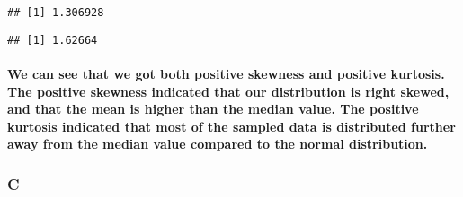 \documentclass[
]{article}
\newenvironment{Shaded}{\begin{snugshade}}{\end{snugshade}}
\newcommand{\ConstantTok}[1]{\textcolor[rgb]{0.00,0.00,0.00}{#1}}
\newcommand{\FunctionTok}[1]{\textcolor[rgb]{0.00,0.00,0.00}{#1}}
\newcommand{\NormalTok}[1]{#1}
\newcommand{\SpecialCharTok}[1]{\textcolor[rgb]{0.00,0.00,0.00}{#1}}
\begin{document}
\begin{Shaded}
\end{Shaded}

\begin{verbatim}
## [1] 1.306928
\end{verbatim}

\begin{Shaded}
\end{Shaded}

\begin{verbatim}
## [1] 1.62664
\end{verbatim}

\hypertarget{we-can-see-that-we-got-both-positive-skewness-and-positive-kurtosis.-the-positive-skewness-indicated-that-our-distribution-is-right-skewed-and-that-the-mean-is-higher-than-the-median-value.-the-positive-kurtosis-indicated-that-most-of-the-sampled-data-is-distributed-further-away-from-the-median-value-compared-to-the-normal-distribution.}{%
\paragraph{We can see that we got both positive skewness and positive
kurtosis. The positive skewness indicated that our distribution is right
skewed, and that the mean is higher than the median value. The positive
kurtosis indicated that most of the sampled data is distributed further
away from the median value compared to the normal
distribution.}\label{we-can-see-that-we-got-both-positive-skewness-and-positive-kurtosis.-the-positive-skewness-indicated-that-our-distribution-is-right-skewed-and-that-the-mean-is-higher-than-the-median-value.-the-positive-kurtosis-indicated-that-most-of-the-sampled-data-is-distributed-further-away-from-the-median-value-compared-to-the-normal-distribution.}}

\hypertarget{c}{%
\subsubsection{C}\label{c}}
\end{document}
